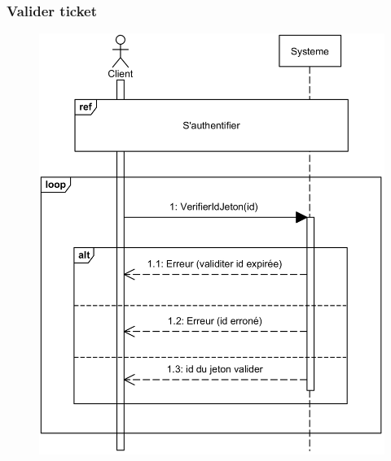     \subsubsection[Valider ticket]{Valider ticket}
        \begin{figure}[H]
            \centering
            \includegraphics[width=130mm]{images/sd-valider-ticket.png}
            \label{fig:sdValiderTicket}
        \end{figure}
\pagebreak
